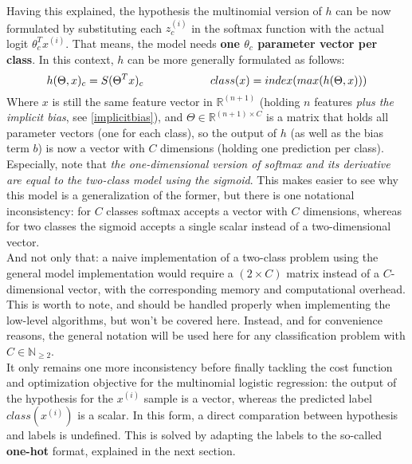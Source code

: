 Having this explained, the hypothesis the multinomial version of \(h\) can be now formulated by substituting each \(z_c^{(i)}\) in the softmax function with the actual logit \(\theta_c^Tx^{(i)}\). That means, the model needs \textbf{one \(\theta_c\) parameter vector per class}. In this context, \(h\) can be more generally formulated as follows:\\
\begin{equation*}
  h(\Theta, x)_c = S(\Theta^Tx)_c \qquad \qquad \qquad class(x) = index(max(h(\Theta, x)))\\[3mm]
\end{equation*}
Where \(x\) is still the same feature vector in \(\mathbb{R}^{(n+1)}\) (holding \(n\) features {\it plus the implicit bias}, see \ref{implicitbias}), and \(\Theta\in\mathbb{R}^{(n+1)\times C}\) is a matrix that holds all parameter vectors (one for each class), so the output of \(h\) (as well as the bias term \(b\)) is now a vector with \(C\) dimensions (holding one prediction per class).\\

Especially, note that {\it the one-dimensional version of softmax and its derivative are equal to the two-class model using the sigmoid}. This makes easier to see why this model is a generalization of the former, but there is one notational inconsistency: for \(C\) classes softmax accepts a vector with \(C\) dimensions, whereas for two classes the sigmoid accepts a single scalar instead of a two-dimensional vector.\\

And not only that: a naive implementation of a two-class problem using the general model implementation would require a \((2\times C)\) matrix instead of a \(C\)-dimensional vector, with the corresponding memory and computational overhead. This is worth to note, and should be handled properly when implementing the low-level algorithms, but won't be covered here. Instead, and for convenience reasons, the general notation will be used here for any classification problem with \(C\in \mathbb{N}_{\geq 2}\).\\

It only remains one more inconsistency before finally tackling the cost function and optimization objective for the multinomial logistic regression: the output of the hypothesis for the \(x^{(i)}\) sample is a vector, whereas the predicted label \(class(x^{(i)})\) is a scalar. In this form, a direct comparation between hypothesis and labels is undefined. This is solved by adapting the labels to the so-called \textbf{one-hot} format, explained in the next section.


